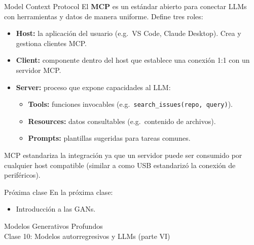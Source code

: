 \documentclass{beamer}
\begin{document}
\begin{frame}{Model Context Protocol}
    El \textbf{MCP} es un estándar abierto para conectar LLMs con herramientas y datos de manera uniforme. Define tres roles:
    \begin{itemize}
        \item \textbf{Host:} la aplicación del usuario (e.g.\ VS Code, Claude Desktop). Crea y gestiona clientes MCP.
        \item \textbf{Client:} componente dentro del host que establece una conexión 1:1 con un servidor MCP.
        \item \textbf{Server:} proceso que expone capacidades al LLM:
              \begin{itemize}
                  \item \textbf{Tools:} funciones invocables (e.g.\ \texttt{search\_issues(repo, query)}).
                  \item \textbf{Resources:} datos consultables (e.g.\ contenido de archivos).
                  \item \textbf{Prompts:} plantillas sugeridas para tareas comunes.
              \end{itemize}
    \end{itemize}
    MCP estandariza la integración ya que un servidor puede ser consumido por cualquier host compatible (similar a como USB estandarizó la conexión de periféricos).
\end{frame}

\begin{frame}{Próxima clase}
    En la próxima clase:
    \begin{itemize}
        \item Introducción a las GANs.
    \end{itemize}
\end{frame}

\begin{frame}
    \centering
    \Large{Modelos Generativos Profundos}\\
    \large{Clase 10: Modelos autorregresivos y LLMs (parte VI)}
\end{frame}
\end{document}
